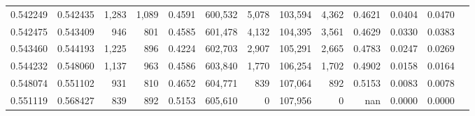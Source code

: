 \begin{tabular}{rrrrrrrrrrrrr}
0.542249 & 0.542435 &  1,283 & 1,089 &                                     0.4591 & 600,532 &   5,078 & 103,594 &   4,362 & 0.4621 & 0.0404 & 0.0470 \\
0.542475 & 0.543409 &    946 &   801 &                                     0.4585 & 601,478 &   4,132 & 104,395 &   3,561 & 0.4629 & 0.0330 & 0.0383 \\
0.543460 & 0.544193 &  1,225 &   896 &                                     0.4224 & 602,703 &   2,907 & 105,291 &   2,665 & 0.4783 & 0.0247 & 0.0269 \\
0.544232 & 0.548060 &  1,137 &   963 &                                     0.4586 & 603,840 &   1,770 & 106,254 &   1,702 & 0.4902 & 0.0158 & 0.0164 \\
0.548074 & 0.551102 &    931 &   810 &                                     0.4652 & 604,771 &     839 & 107,064 &     892 & 0.5153 & 0.0083 & 0.0078 \\
0.551119 & 0.568427 &    839 &   892 &                                     0.5153 & 605,610 &       0 & 107,956 &       0 &    nan & 0.0000 & 0.0000 \\
\bottomrule
\end{tabular}
